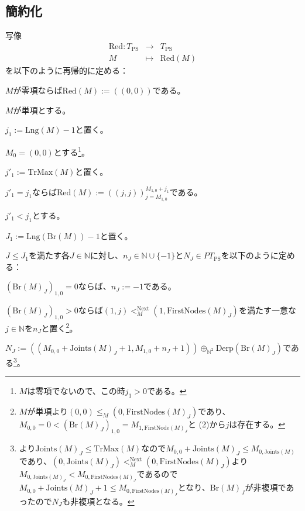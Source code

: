 \documentclass[dvipdfmx,uplatex]{jsarticle}
\theoremstyle{customnonumberbreakfortheorem}
\theoremstyle{customnonumberbreakforproof}
\begin{document}
\subsection{簡約化}

写像
\begin{eqnarray*}
\textrm{Red} \colon T_{\textrm{PS}} & \to & T_{\textrm{PS}} \\
M & \mapsto & \textrm{Red}(M)
\end{eqnarray*}
を以下のように再帰的に定める：
\begin{nenumerate}
	\item \(M\)が零項ならば\(\textrm{Red}(M) := ((0,0))\)である。
	\item \(M\)が単項とする。
	\begin{nenumerate}
		\item \(j_1 := \textrm{Lng}(M) - 1\)と置く。
		\item \(M_0 = (0,0)\)とする\footnote{\(M\)は零項でないので、この時\(j_1 > 0\)である。}。
		\begin{nenumerate}
			\item \(j'_1 := \textrm{TrMax}(M)\)と置く。
			\item \(j'_1 = j_1\)ならば\(\textrm{Red}(M) := ((j,j))_{j=M_{1,0}}^{M_{1,0}+j_1}\)である。
			\item \(j'_1 < j_1\)とする。
			\item \(J_1 := \textrm{Lng}(\textrm{Br}(M)) - 1\)と置く。
			\item \(J \leq J_1\)を満たす各\(J \in \mathbb{N}\)に対し、\(n_J \in \mathbb{N} \cup \{-1\}\)と\(N_J \in PT_{\textrm{PS}}\)を以下のように定める：
			\begin{nenumerate}
				\item \((\textrm{Br}(M)_J)_{1,0} = 0\)ならば、\(n_J := -1\)である。
				\item \((\textrm{Br}(M)_J)_{1,0} > 0\)ならば\((1,j) <_M^{\textrm{Next}} (1,\textrm{FirstNodes}(M)_J)\)を満たす一意な\(j \in \mathbb{N}\)を\(n_J\)と置く\footnote{\(M\)が単項より\((0,0) \leq_M (0,\textrm{FirstNodes}(M)_J)\)であり、\(M_{0,0} = 0 < (\textrm{Br}(M)_J)_{1,0} = M_{1,\textrm{FirstNode}(M)_J}\)と (2)から\(j\)は存在する。}。
				\item \(N_J := ((M_{0,0} + \textrm{Joints}(M)_J + 1,M_{1,0} + n_J + 1)) \oplus_{\mathbb{N}^2} \textrm{Derp}(\textrm{Br}(M)_J)\)である\footnote{より\(\textrm{Joints}(M)_J \leq \textrm{TrMax}(M)\)なので\(M_{0,0} + \textrm{Joints}(M)_J \leq M_{0,\textrm{Joints}(M)}\)であり、\((0,\textrm{Joints}(M)_J) <_M^{\textrm{Next}} (0,\textrm{FirstNodes}(M)_J)\)より\(M_{0,\textrm{Joints}(M)_J} < M_{0,\textrm{FirstNodes}(M)_J}\)であるので\(M_{0,0} + \textrm{Joints}(M)_J + 1 \leq M_{0,\textrm{FirstNodes}(M)_J}\)となり、\(\textrm{Br}(M)_J\)が非複項であったので\(N_J\)も非複項となる。}。

\end{nenumerate}
\end{nenumerate}
\end{nenumerate}
\end{nenumerate}
\end{document}
